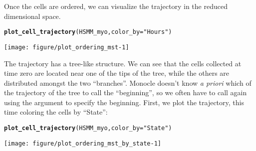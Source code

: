 \documentclass[10pt,oneside]{article}\usepackage[]{graphicx}\usepackage[]{color}
\makeatletter
\def\maxwidth{ %
  \ifdim\Gin@nat@width>\linewidth
    \linewidth
  \else
    \Gin@nat@width
  \fi
}
\newcommand{\hlstr}[1]{\textcolor[rgb]{0.192,0.494,0.8}{#1}}%
\newcommand{\hlstd}[1]{\textcolor[rgb]{0.345,0.345,0.345}{#1}}%
\newcommand{\hlkwc}[1]{\textcolor[rgb]{0.333,0.667,0.333}{#1}}%
\newcommand{\hlkwd}[1]{\textcolor[rgb]{0.737,0.353,0.396}{\textbf{#1}}}%
\newenvironment{kframe}{%
 \def\at@end@of@kframe{}%
 \ifinner\ifhmode%
  \def\at@end@of@kframe{\end{minipage}}%
  \begin{minipage}{\columnwidth}%
 \fi\fi%
 \def\FrameCommand##1{\hskip\@totalleftmargin \hskip-\fboxsep
 \colorbox{shadecolor}{##1}\hskip-\fboxsep
     \hskip-\linewidth \hskip-\@totalleftmargin \hskip\columnwidth}%
 \MakeFramed {\advance\hsize-\width
   \@totalleftmargin\z@ \linewidth\hsize
   \@setminipage}}%
 {\par\unskip\endMakeFramed%
 \at@end@of@kframe}
\newenvironment{knitrout}{}{} %
\makeatother
\begin{document}
Once the cells are ordered, we can visualize the trajectory in the reduced 
dimensional space.
 
\begin{knitrout}
\color{fgcolor}\begin{kframe}
\begin{alltt}
\hlkwd{plot_cell_trajectory}\hlstd{(HSMM_myo,} \hlkwc{color_by}\hlstd{=}\hlstr{"Hours"}\hlstd{)}
\end{alltt}
\end{kframe}

{\centering \texttt{[image: figure/plot\_ordering\_mst-1]} 

}



\end{knitrout}
 
 The trajectory has a tree-like structure. We can see that the cells 
 collected at time zero are located near one of the tips of the tree, while the 
 others are distributed amongst the two ``branches''.  Monocle doesn't know
 \emph{a priori} which of the trajectory of the tree to call the ``beginning'',
 so we often have to call  again using the 
  argument to specify the beginning. First, we plot the
 trajectory, this time coloring the cells by ``State'':
 
\begin{knitrout}
\color{fgcolor}\begin{kframe}
\begin{alltt}
\hlkwd{plot_cell_trajectory}\hlstd{(HSMM_myo,} \hlkwc{color_by}\hlstd{=}\hlstr{"State"}\hlstd{)}
\end{alltt}
\end{kframe}

{\centering \texttt{[image: figure/plot\_ordering\_mst\_by\_state-1]} 

}



\end{knitrout}
\end{document}
